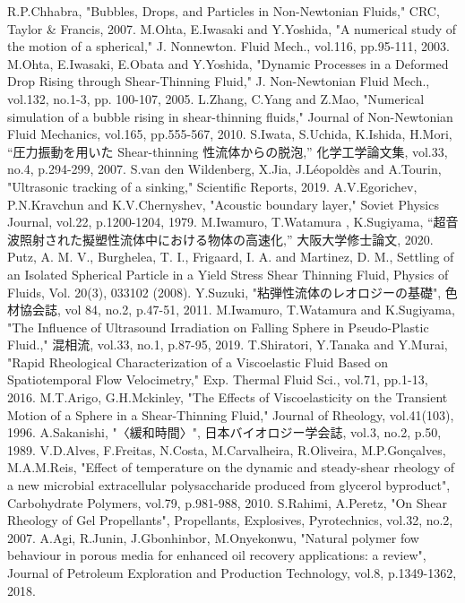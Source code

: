 \begin{thebibliography}{99}
     R.P.Chhabra, "Bubbles, Drops, and Particles in Non-Newtonian Fluids," CRC, Taylor \& Francis, 2007.
     M.Ohta, E.Iwasaki and Y.Yoshida, "A numerical study of the motion of a spherical," J. Nonnewton. Fluid Mech., vol.116, pp.95-111, 2003.
     M.Ohta, E.Iwasaki, E.Obata and Y.Yoshida, "Dynamic Processes in a Deformed Drop Rising through Shear-Thinning Fluid," J. Non-Newtonian Fluid Mech., vol.132, no.1-3, pp. 100-107, 2005.
     L.Zhang, C.Yang and Z.Mao, "Numerical simulation of a bubble rising in shear-thinning fluids," Journal of Non-Newtonian Fluid Mechanics, vol.165, pp.555-567, 2010.
     S.Iwata, S.Uchida, K.Ishida, H.Mori, “圧力振動を用いた Shear-thinning 性流体からの脱泡,” 化学工学論文集, vol.33, no.4, p.294-299, 2007.
     S.van den Wildenberg, X.Jia, J.Léopoldès and A.Tourin, "Ultrasonic tracking of a sinking," Scientific Reports, 2019.
     A.V.Egorichev, P.N.Kravchun and K.V.Chernyshev, "Acoustic boundary layer," Soviet Physics Journal, vol.22, p.1200-1204, 1979.
     M.Iwamuro, T.Watamura , K.Sugiyama, “超音波照射された擬塑性流体中における物体の高速化,” 大阪大学修士論文, 2020.
     Putz, A. M. V., Burghelea, T. I., Frigaard, I. A. and Martinez, D. M., Settling of an Isolated Spherical Particle in a Yield Stress Shear Thinning Fluid, Physics of Fluids, Vol. 20(3), 033102 (2008).
     Y.Suzuki, "粘弾性流体のレオロジーの基礎", 色材協会誌, vol 84, no.2, p.47-51, 2011.
     M.Iwamuro, T.Watamura and K.Sugiyama, "The Influence of Ultrasound Irradiation on Falling Sphere in Pseudo-Plastic Fluid.," 混相流, vol.33, no.1, p.87-95, 2019.
     T.Shiratori, Y.Tanaka and Y.Murai, "Rapid Rheological Characterization of a Viscoelastic Fluid Based on Spatiotemporal Flow Velocimetry," Exp. Thermal Fluid Sci., vol.71, pp.1-13, 2016.
     M.T.Arigo, G.H.Mckinley, "The Effects of Viscoelasticity on the Transient Motion of a Sphere in a Shear-Thinning Fluid," Journal of Rheology, vol.41(103), 1996.
     A.Sakanishi, "〈緩和時間〉", 日本バイオロジー学会誌, vol.3, no.2, p.50, 1989.
     V.D.Alves, F.Freitas, N.Costa, M.Carvalheira, R.Oliveira, M.P.Gonçalves, M.A.M.Reis, "Effect of temperature on the dynamic and steady-shear rheology of a new microbial extracellular polysaccharide produced from glycerol byproduct", Carbohydrate Polymers, vol.79, p.981-988, 2010.
     S.Rahimi, A.Peretz, "On Shear Rheology of Gel Propellants", Propellants, Explosives, Pyrotechnics, vol.32, no.2, 2007.
     A.Agi, R.Junin, J.Gbonhinbor, M.Onyekonwu, "Natural polymer fow behaviour in porous media for enhanced oil recovery applications: a review", Journal of Petroleum Exploration and Production Technology, vol.8, p.1349-1362, 2018.
\end{thebibliography}